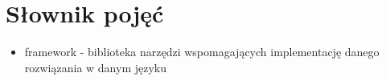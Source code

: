 \documentclass[../main.tex]{subfiles}
\begin{document}
\section{Słownik pojęć}
    \begin{itemize}
        \item framework - biblioteka narzędzi wspomagających implementację danego rozwiązania w danym języku
    \end{itemize}
\end{document}
